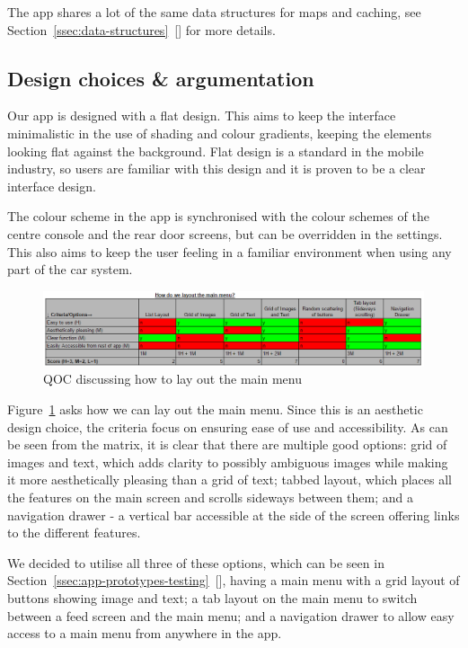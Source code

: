 \documentclass{article}
\begin{document}
The app shares a lot of the same data structures for maps and caching, see Section~\ref{ssec:data-structures}~[] for more details.

\subsection{Design choices \& argumentation}\label{ssec:app-design}


Our app is designed with a flat design. This aims to keep the interface minimalistic in the use of shading and colour gradients, keeping the elements looking flat against the background. Flat design is a standard in the mobile industry, so users are familiar with this design and it is proven to be a clear interface design.

The colour scheme in the app is synchronised with the colour schemes of the centre console and the rear door screens, but can be overridden in the settings. This also aims to keep the user feeling in a familiar environment when using any part of the car system.

\begin{figure}[H]
  \centering
  \includegraphics[scale=0.6]{qoc-app-menu}
  \caption{QOC discussing how to lay out the main menu}\label{qoc-app-menu}
\end{figure}

Figure~\ref{qoc-app-menu} asks how we can lay out the main menu. Since this is an aesthetic design choice, the criteria focus on ensuring ease of use and accessibility. As can be seen from the matrix, it is clear that there are multiple good options: grid of images and text, which adds clarity to possibly ambiguous images while making it more aesthetically pleasing than a grid of text; tabbed layout, which places all the features on the main screen and scrolls sideways between them; and a navigation drawer - a vertical bar accessible at the side of the screen offering links to the different features.

We decided to utilise all three of these options, which can be seen in Section~\ref{ssec:app-prototypes-testing}~[], having a main menu with a grid layout of buttons showing image and text; a tab layout on the main menu to switch between a feed screen and the main menu; and a navigation drawer to allow easy access to a main menu from anywhere in the app.
\end{document}
